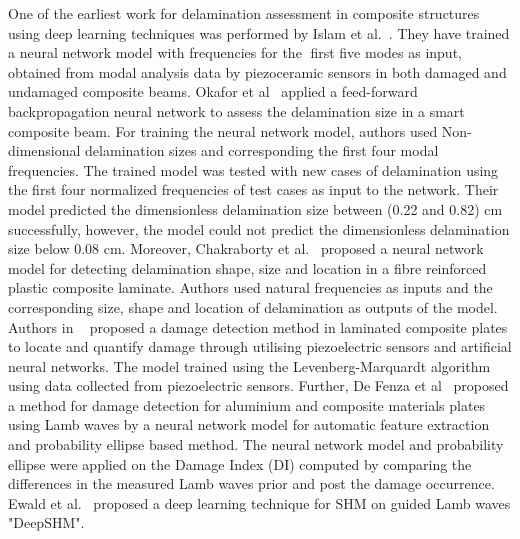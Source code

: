 \documentclass[preprint,9pt]{elsarticle}
\begin{document}
  	One of the earliest work for delamination assessment in composite structures using deep learning techniques was performed by Islam et al.~\cite{islam1994damage}. 
  	They have trained a neural network model with frequencies for the first five modes as input, obtained from modal analysis data by piezoceramic sensors in both damaged and undamaged composite beams.
  	Okafor et al~\cite{okafor1996delamination} applied a feed-forward backpropagation neural network to assess the delamination size in a smart composite beam. 
  	For training the neural network model, authors used Non-dimensional delamination sizes and corresponding the first four modal frequencies. 
  	The trained model was tested with new cases of delamination using the first four normalized frequencies of test cases as input to the network. 
  	Their model predicted the dimensionless delamination size between (0.22 and 0.82) cm successfully,  however, the model could not predict the dimensionless delamination size below 0.08 cm.
  	Moreover, Chakraborty et al.~\cite{chakraborty2005artificial} proposed a neural network model for detecting delamination shape, size and location in a fibre reinforced plastic composite laminate.
  	Authors used natural frequencies as inputs and the corresponding size, shape and location of delamination as outputs of the model. 
  	Authors in ~\cite{roseiro2005neural}  proposed a damage detection method in laminated composite plates to locate and quantify damage through utilising piezoelectric sensors and artificial neural networks. 
  	The model trained using the Levenberg-Marquardt algorithm using data collected from piezoelectric sensors.  
  	Further, De Fenza et al~\cite{de2015application} proposed a method for damage detection for aluminium and composite materials plates using Lamb waves by a neural network model for automatic feature extraction and probability ellipse based method. 
  	The neural network model and probability ellipse were applied on the Damage Index (DI) computed by comparing the differences in the measured  Lamb waves prior and post the damage occurrence. 
  	Ewald et al.~\cite{Ewald2019} proposed a deep learning technique for SHM on guided Lamb waves "DeepSHM". 
\end{document}
